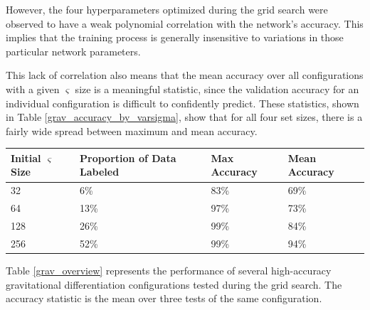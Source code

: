 \documentclass[10pt]{article}
\begin{document}
However, the four hyperparameters optimized during the grid search were observed to have a weak polynomial correlation with the network's accuracy. This implies that the training process is generally insensitive to variations in those particular network parameters.

This lack of correlation also means that the mean accuracy over all configurations with a given $\varsigma$ size is a meaningful statistic, since the validation accuracy for an individual configuration is difficult to confidently predict. These statistics, shown in Table \ref{grav_accuracy_by_varsigma}, show that for all four set sizes, there is a fairly wide spread between maximum and mean accuracy.

\begin{minipage}{\textwidth}
    \begin{center}
         \label{grav_accuracy_by_varsigma}
        \begin{tabular}{|l|l|l|l|}
            \hline
            Initial $\varsigma$ Size & Proportion of Data Labeled & Max Accuracy & Mean Accuracy \\
            \hline
            32 & 6\% & 83\% & 69\% \\
            \hline
            64 & 13\% & 97\% & 73\% \\
            \hline
            128 & 26\% & 99\% & 84\% \\
            \hline
            256 & 52\% & 99\% & 94\% \\
            \hline
        \end{tabular}
    \end{center}
\end{minipage}

Table \ref{grav_overview} represents the performance of several high-accuracy gravitational differentiation configurations tested during the grid search. The accuracy statistic is the mean over three tests of the same configuration.
\end{document}
